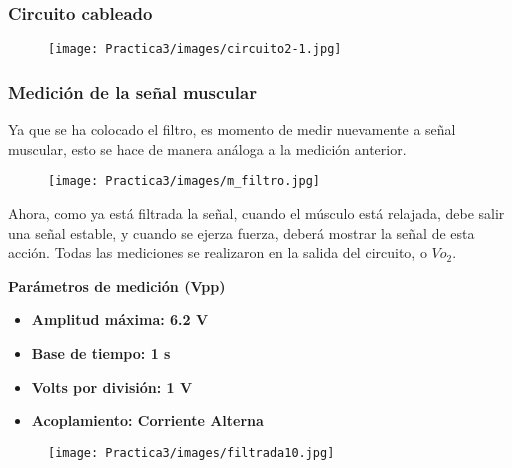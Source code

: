 \documentclass[12pt]{article}
\begin{document}
	\subsubsection{Circuito cableado}
		\begin{figure}[h!]
                \centering
                \texttt{[image: Practica3/images/circuito2-1.jpg]}
    \end{figure} 
    \newpage
	\subsubsection{Medición de la señal muscular}
	Ya que se ha colocado el filtro, es momento de medir nuevamente a señal muscular, esto se hace de manera análoga a la medición anterior. 
	
	\begin{figure}[h!]
                \centering
                \texttt{[image: Practica3/images/m\_filtro.jpg]}
            \end{figure}

        Ahora, como ya está filtrada la señal, cuando el músculo está relajada, debe salir una señal estable, y cuando se ejerza fuerza, deberá mostrar la señal de esta acción. Todas las mediciones se realizaron en la salida del circuito, o $Vo_{2}$.
        
        \textbf{Parámetros de medición (Vpp)}
            \begin{multicols}{2}
                \begin{itemize}
                    \item[\checkmark] \textbf{Amplitud máxima: 6.2 V}
                    \item[\checkmark] \textbf{Base de tiempo: 1 s}
            \columnbreak
                    \item[\checkmark] \textbf{Volts por división: 1 V}
                    \item[\checkmark] \textbf{Acoplamiento: Corriente Alterna}
                \end{itemize}
            \end{multicols}
            \newpage
         
            \begin{figure}[h!]
                \centering
                \texttt{[image: Practica3/images/filtrada10.jpg]}
            \end{figure}
            
\end{document}
